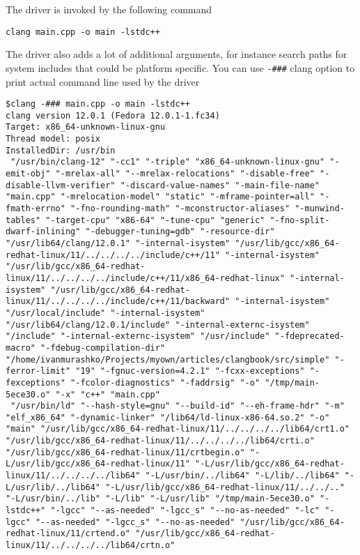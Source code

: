 The driver is invoked by the following command
\begin{verbatim}
clang main.cpp -o main -lstdc++
\end{verbatim}
The driver also adds a lot of additional arguments, for instance
search paths for system includes that could be platform specific.
You can use \texttt{-###} clang option to print actual
command line used by the driver
\begin{verbatim}
$clang -### main.cpp -o main -lstdc++
clang version 12.0.1 (Fedora 12.0.1-1.fc34)
Target: x86_64-unknown-linux-gnu
Thread model: posix
InstalledDir: /usr/bin
 "/usr/bin/clang-12" "-cc1" "-triple" "x86_64-unknown-linux-gnu" "-emit-obj" "-mrelax-all" "--mrelax-relocations" "-disable-free" "-disable-llvm-verifier" "-discard-value-names" "-main-file-name" "main.cpp" "-mrelocation-model" "static" "-mframe-pointer=all" "-fmath-errno" "-fno-rounding-math" "-mconstructor-aliases" "-munwind-tables" "-target-cpu" "x86-64" "-tune-cpu" "generic" "-fno-split-dwarf-inlining" "-debugger-tuning=gdb" "-resource-dir" "/usr/lib64/clang/12.0.1" "-internal-isystem" "/usr/lib/gcc/x86_64-redhat-linux/11/../../../../include/c++/11" "-internal-isystem" "/usr/lib/gcc/x86_64-redhat-linux/11/../../../../include/c++/11/x86_64-redhat-linux" "-internal-isystem" "/usr/lib/gcc/x86_64-redhat-linux/11/../../../../include/c++/11/backward" "-internal-isystem" "/usr/local/include" "-internal-isystem" "/usr/lib64/clang/12.0.1/include" "-internal-externc-isystem" "/include" "-internal-externc-isystem" "/usr/include" "-fdeprecated-macro" "-fdebug-compilation-dir" "/home/ivanmurashko/Projects/myown/articles/clangbook/src/simple" "-ferror-limit" "19" "-fgnuc-version=4.2.1" "-fcxx-exceptions" "-fexceptions" "-fcolor-diagnostics" "-faddrsig" "-o" "/tmp/main-5ece30.o" "-x" "c++" "main.cpp"
 "/usr/bin/ld" "--hash-style=gnu" "--build-id" "--eh-frame-hdr" "-m" "elf_x86_64" "-dynamic-linker" "/lib64/ld-linux-x86-64.so.2" "-o" "main" "/usr/lib/gcc/x86_64-redhat-linux/11/../../../../lib64/crt1.o" "/usr/lib/gcc/x86_64-redhat-linux/11/../../../../lib64/crti.o" "/usr/lib/gcc/x86_64-redhat-linux/11/crtbegin.o" "-L/usr/lib/gcc/x86_64-redhat-linux/11" "-L/usr/lib/gcc/x86_64-redhat-linux/11/../../../../lib64" "-L/usr/bin/../lib64" "-L/lib/../lib64" "-L/usr/lib/../lib64" "-L/usr/lib/gcc/x86_64-redhat-linux/11/../../.." "-L/usr/bin/../lib" "-L/lib" "-L/usr/lib" "/tmp/main-5ece30.o" "-lstdc++" "-lgcc" "--as-needed" "-lgcc_s" "--no-as-needed" "-lc" "-lgcc" "--as-needed" "-lgcc_s" "--no-as-needed" "/usr/lib/gcc/x86_64-redhat-linux/11/crtend.o" "/usr/lib/gcc/x86_64-redhat-linux/11/../../../../lib64/crtn.o"
\end{verbatim}
